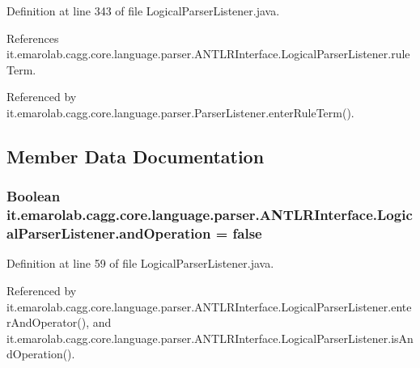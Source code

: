 Definition at line 343 of file Logical\-Parser\-Listener.\-java.



References it.\-emarolab.\-cagg.\-core.\-language.\-parser.\-A\-N\-T\-L\-R\-Interface.\-Logical\-Parser\-Listener.\-rule\-Term.



Referenced by it.\-emarolab.\-cagg.\-core.\-language.\-parser.\-Parser\-Listener.\-enter\-Rule\-Term().



\subsection{Member Data Documentation}
\hypertarget{classit_1_1emarolab_1_1cagg_1_1core_1_1language_1_1parser_1_1ANTLRInterface_1_1LogicalParserListener_a6f4b12c8a3d39b1d65420325d17a99df}{
\subsubsection[{and\-Operation}]{\setlength{\rightskip}{0pt plus 5cm}Boolean it.\-emarolab.\-cagg.\-core.\-language.\-parser.\-A\-N\-T\-L\-R\-Interface.\-Logical\-Parser\-Listener.\-and\-Operation = false\hspace{0.3cm}{\ttfamily [private]}}}\label{classit_1_1emarolab_1_1cagg_1_1core_1_1language_1_1parser_1_1ANTLRInterface_1_1LogicalParserListener_a6f4b12c8a3d39b1d65420325d17a99df}


Definition at line 59 of file Logical\-Parser\-Listener.\-java.



Referenced by it.\-emarolab.\-cagg.\-core.\-language.\-parser.\-A\-N\-T\-L\-R\-Interface.\-Logical\-Parser\-Listener.\-enter\-And\-Operator(), and it.\-emarolab.\-cagg.\-core.\-language.\-parser.\-A\-N\-T\-L\-R\-Interface.\-Logical\-Parser\-Listener.\-is\-And\-Operation().


